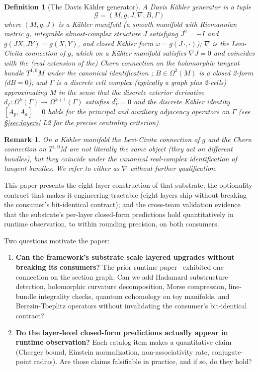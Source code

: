 \documentclass[11pt,letterpaper]{article}
\newtheorem{definition}[theorem]{Definition}
\newtheorem{remark}[theorem]{Remark}
\begin{document}
\begin{definition}[The Davis K\"ahler generator]
\label{def:generator}
A \emph{Davis K\"ahler generator} is a tuple
\[
\mathcal{G} = (M, g, J, \nabla, B, \Gamma)
\]
where $(M, g, J)$ is a K\"ahler manifold (a smooth manifold with
Riemannian metric $g$, integrable almost-complex structure $J$
satisfying $J^2 = -I$ and $g(J X, J Y) = g(X, Y)$, and closed
K\"ahler form $\omega = g(J\,\cdot, \cdot)$); $\nabla$ is the
Levi-Civita connection of $g$, which on a K\"ahler manifold satisfies
$\nabla J = 0$ and coincides with the (real extension of the) Chern
connection on the holomorphic tangent bundle $T^{1,0} M$ under the
canonical identification \cite[Vol.~II, Ch.~IX, Thm.~4.6]{kobayashi1969foundations};
$B \in \Omega^2(M)$ is a closed 2-form ($dB = 0$); and $\Gamma$ is a
discrete cell complex (typically a graph plus 2-cells) approximating
$M$ in the sense that the discrete exterior derivative
$d_\Gamma: \Omega^k(\Gamma) \to \Omega^{k+1}(\Gamma)$ satisfies
$d_\Gamma^2 = 0$ and the discrete K\"ahler identity
$[A_p, A_a] = 0$ holds for the principal and auxiliary adjacency
operators on $\Gamma$ (see \S\ref{sec:layers} L2 for the precise
centrality criterion).
\end{definition}

\begin{remark}
On a K\"ahler manifold the Levi-Civita connection of $g$ and the
Chern connection on $T^{1,0} M$ are not literally the same object
(they act on different bundles), but they coincide under the
canonical real-complex identification of tangent bundles. We refer
to either as $\nabla$ without further qualification.
\end{remark}

This paper presents the eight-layer construction of that substrate;
the optionality contract that makes it engineering-tractable (eight
layers ship without breaking the consumer's bit-identical contract);
and the cross-team validation evidence that the substrate's per-layer
closed-form predictions hold quantitatively in runtime observation,
to within rounding precision, on both consumers.

Two questions motivate the paper:

\begin{enumerate}[nosep]
\item \textbf{Can the framework's substrate scale layered upgrades
  without breaking its consumers?} The prior runtime
  paper~\cite{davis2026sheafcomposition} exhibited one connection on
  the section graph. Can we add Hadamard substructure detection,
  holomorphic curvature decomposition, Morse compression,
  line-bundle integrality checks, quantum cohomology on toy
  manifolds, and Berezin-Toeplitz operators without invalidating the
  consumer's bit-identical contract?
\item \textbf{Do the layer-level closed-form predictions actually
  appear in runtime observation?} Each catalog item makes a
  quantitative claim (Cheeger bound, Einstein normalization,
  non-associativity rate, conjugate-point radius). Are those claims
  falsifiable in practice, and if so, do they hold?
\end{enumerate}
\end{document}
